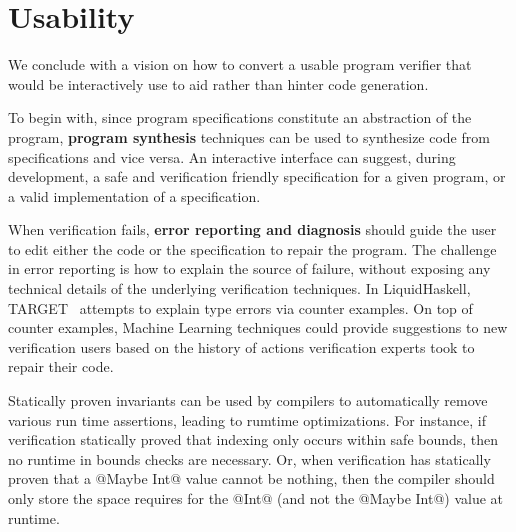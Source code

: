 \section{Usability}
We conclude with a vision on how to convert \toolname 
a usable program verifier that would be interactively 
use to aid rather than hinter code generation.

To begin with, since program specifications constitute an abstraction 
of the program, 
\textbf{program synthesis} techniques can be used to synthesize
code from specifications and vice versa. 
%
An interactive interface can suggest, during development,  
a safe and verification friendly specification for a given program, 
or a valid implementation of a specification. 
%

When verification fails, 
\textbf{error reporting and diagnosis} should guide the user 
to edit either the code or the specification to repair the program. 
%
The challenge in error reporting is how to explain 
the source of failure, 
without exposing any technical details 
of the underlying verification techniques. 
%
In LiquidHaskell, TARGET~\cite{TARGET} attempts to explain 
type errors via counter examples. 
%
On top of counter examples, %
Machine Learning techniques could 
provide suggestions to new verification users
based on the history of actions verification experts 
took to repair their code.  
% 

Statically proven invariants can be used by compilers 
to automatically remove various run time assertions, 
leading to rumtime optimizations.
For instance, if verification statically proved that indexing only occurs
within safe bounds, then no runtime in bounds checks are necessary. 
%
Or, when verification has statically proven that a @Maybe Int@ value cannot be nothing, 
then the compiler should only store the space requires for the @Int@ (and not the @Maybe Int@)
value at runtime. 



